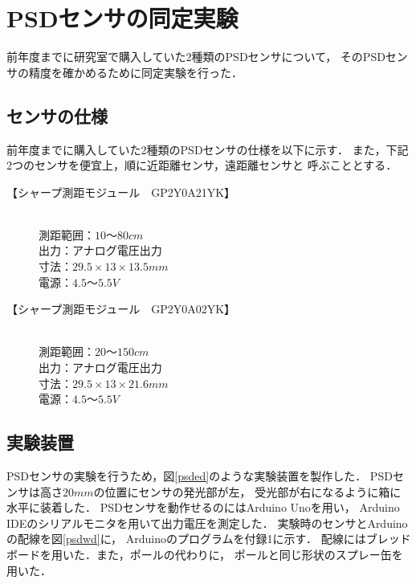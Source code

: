\documentclass[10pt,a4j]{jarticle}
\begin{document}
\section{PSDセンサの同定実験}
\label{psdex}

前年度までに研究室で購入していた2種類のPSDセンサについて，
そのPSDセンサの精度を確かめるために同定実験を行った．

\subsection{センサの仕様}
前年度までに購入していた2種類のPSDセンサの仕様を以下に示す．
また，下記2つのセンサを便宜上，順に近距離センサ，遠距離センサと
呼ぶこととする．\\

 \begin{description}
  \item[【シャープ測距モジュール　GP2Y0A21YK】] \mbox{} \\
	     測距範囲：$10〜80\unit{cm}$ \\
	     出力：アナログ電圧出力 \\
	     寸法：$29.5×13×13.5\unit{mm}$ \\
	     電源：$4.5〜5.5\unit{V}$
  \item[【シャープ測距モジュール　GP2Y0A02YK】] \mbox{} \\
	     測距範囲：$20〜150\unit{cm}$ \\
	     出力：アナログ電圧出力 \\
	     寸法：$29.5×13×21.6\unit{mm}$ \\
	     電源：$4.5〜5.5\unit{V}$
 \end{description}


\subsection{実験装置}
PSDセンサの実験を行うため，図\ref{psded}のような実験装置を製作した．
PSDセンサは高さ$20\unit{mm}$の位置にセンサの発光部が左，
受光部が右になるように箱に水平に装着した．
PSDセンサを動作せるのにはArduino Unoを用い，
Arduino IDEのシリアルモニタを用いて出力電圧を測定した．
実験時のセンサとArduinoの配線を図\ref{psdwd}に，
Arduinoのプログラムを付録1に示す．
配線にはブレッドボードを用いた．また，ポールの代わりに，
ポールと同じ形状のスプレー缶を用いた．
\end{document}

